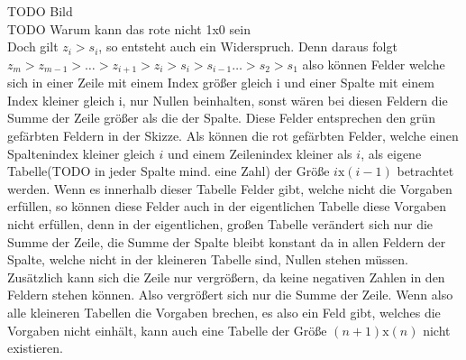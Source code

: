 \documentclass[10pt, a4paper]{amsart}
\makeatletter
\renewenvironment{proof}[1][\proofname]{\par
\pushQED{\qed}%
\normalfont \topsep6\p@\@plus6\p@\relax
\trivlist
\item\relax
{\bfseries#1}\hspace\labelsep\ignorespaces
}{%
\popQED\endtrivlist\@endpefalse
}
\newenvironment{proof thm}[1]{
\begin{proof}[\proofname~(#1)]}{\end{proof}}
\makeatother
\begin{document}
\begin{proof}
\begin{itemize}[itemsep=2ex]
    TODO Bild\\
    TODO Warum kann das rote nicht 1x0 sein\\
    
    Doch gilt $z_i>s_i$, so entsteht auch ein Widerspruch. Denn daraus folgt
    $z_m>z_{m-1}>\ldots>z_{i+1}>z_i>s_i>s_{i-1}\ldots>s_2>s_1$ also können
    Felder welche sich in einer Zeile mit einem Index größer gleich i und einer
    Spalte mit einem Index kleiner gleich i, nur Nullen beinhalten, sonst wären
    bei diesen Feldern die Summe der Zeile größer als die der Spalte. Diese
    Felder entsprechen den grün gefärbten Feldern in der Skizze. Als können die
    rot gefärbten Felder, welche einen Spaltenindex kleiner gleich $i$ und einem
    Zeilenindex kleiner als $i$, als eigene Tabelle(TODO in jeder Spalte mind.
    eine Zahl) der Größe $ i\text{x}(i-1) $ betrachtet werden. Wenn es innerhalb
    dieser Tabelle Felder gibt, welche nicht die Vorgaben erfüllen, so können
    diese Felder auch in der eigentlichen Tabelle diese Vorgaben nicht erfüllen,
    denn in der eigentlichen, großen Tabelle verändert sich nur die Summe der
    Zeile, die Summe der Spalte bleibt konstant da in allen Feldern der Spalte,
    welche nicht in der kleineren Tabelle sind, Nullen stehen müssen. Zusätzlich
    kann sich die Zeile nur vergrößern, da keine negativen Zahlen in den Feldern
    stehen können. Also vergrößert sich nur die Summe der Zeile. Wenn also alle
    kleineren Tabellen die Vorgaben brechen, es also ein Feld gibt, welches die
    Vorgaben nicht einhält, kann auch eine Tabelle der Größe $(n+1)\text{x}(n)$
    nicht existieren.
  \end{itemize}
\end{proof}
\end{document}
